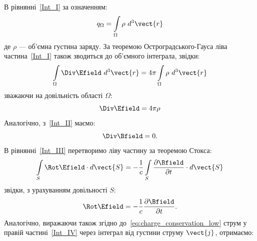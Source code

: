 В рівнянні~\eqref{Int_I} за означенням:
\begin{equation}
	q_{\Omega} = \int\limits_{\Omega} \rho \ d^3\vect{r}
\end{equation}
де $\rho$ ---  об'ємна густина заряду. За теоремою Остроградського-Гауса ліва частина~\eqref{Int_I} також зводиться до
об'ємного інтеграла, звідки:
\begin{equation*}
	\int\limits_{\Omega} \Div\Efield\ d^3\vect{r} = 4\pi\int\limits_{\Omega} \rho\ d^3\vect{r}
\end{equation*}
зважаючи на довільність області $\Omega$:
\begin{equation}\label{eq:M1D}
	\Div\Efield = 4\pi\rho
\end{equation}
Аналогічно, з~\eqref{Int_II} маємо:
\begin{equation}\label{eq:M2D}
	\Div\Bfield = 0.
\end{equation}
В рівнянні~\eqref{Int_III} перетворимо ліву частину за теоремою Стокса:
\begin{equation*}
	\int\limits_{S} \Rot\Efield\cdot d\vect{S} = - \frac1c \int\limits_S \frac{\partial\Bfield}{\partial t}\cdot d\vect{S}
\end{equation*}
звідки, з урахуванням довільності $S$:
\begin{equation}\label{eq:M3D}
	\Rot\Efield = - \frac1c \frac{\partial\Bfield}{\partial t}.
\end{equation}
Аналогічно, виражаючи також згідно до~\eqref{eq:charge_conservation_low} струм у правій частині~\eqref{Int_IV}  через
інтеграл від густини струму $\vect{j}$, отримаємо:

